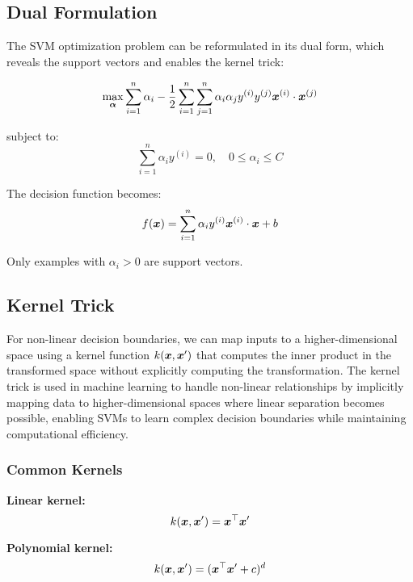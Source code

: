 \subsection{Dual Formulation}

The SVM optimization problem can be reformulated in its dual form, which reveals the support vectors and enables the kernel trick:

\begin{equation}
\max_{\boldsymbol{\alpha}} \sum_{i=1}^{n} \alpha_i - \frac{1}{2} \sum_{i=1}^{n} \sum_{j=1}^{n} \alpha_i \alpha_j y^{(i)} y^{(j)} \boldsymbol{x}^{(i)} \cdot \boldsymbol{x}^{(j)}
\end{equation}

subject to:
\begin{equation}
\sum_{i=1}^{n} \alpha_i y^{(i)} = 0, \quad 0 \leq \alpha_i \leq C
\end{equation}

The decision function becomes:
\begin{equation}
f(\boldsymbol{x}) = \sum_{i=1}^{n} \alpha_i y^{(i)} \boldsymbol{x}^{(i)} \cdot \boldsymbol{x} + b
\end{equation}

Only examples with $\alpha_i > 0$ are support vectors.

\subsection{Kernel Trick}

For non-linear decision boundaries, we can map inputs to a higher-dimensional space using a kernel function $k(\boldsymbol{x}, \boldsymbol{x}')$ that computes the inner product in the transformed space without explicitly computing the transformation. The kernel trick is used in machine learning to handle non-linear relationships by implicitly mapping data to higher-dimensional spaces where linear separation becomes possible, enabling SVMs to learn complex decision boundaries while maintaining computational efficiency.

\subsubsection{Common Kernels}

\textbf{Linear kernel:}
\begin{equation}
k(\boldsymbol{x}, \boldsymbol{x}') = \boldsymbol{x}^\top \boldsymbol{x}'
\end{equation}

\textbf{Polynomial kernel:}
\begin{equation}
k(\boldsymbol{x}, \boldsymbol{x}') = (\boldsymbol{x}^\top \boldsymbol{x}' + c)^d
\end{equation}

